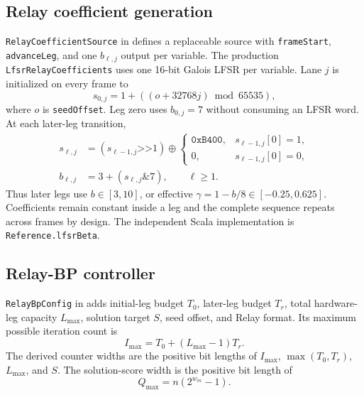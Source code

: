 \documentclass[10pt,conference]{IEEEtran}
\begin{document}
\subsection{Relay coefficient generation}
\texttt{RelayCoefficientSource} in  defines a
replaceable source with \texttt{frameStart}, \texttt{advanceLeg}, and one
$b_{\ell,j}$ output per variable.  The production
\texttt{LfsrRelayCoefficients} uses one 16-bit Galois LFSR per variable.  Lane
$j$ is initialized on every frame to
\begin{equation}
 s_{0,j}=1+\left((o+32768j)\bmod 65535\right),
 \label{eq:lfsr-seed}
\end{equation}
where $o$ is \texttt{seedOffset}.  Leg zero uses $b_{0,j}=7$ without consuming
an LFSR word.  At each later-leg transition,
\begin{align}
 s_{\ell,j}&=(s_{\ell-1,j}\mathbin{\texttt{>>}}1)
 \oplus\begin{cases}
 \mathtt{0xB400},&s_{\ell-1,j}[0]=1,\\
 0,&s_{\ell-1,j}[0]=0,
 \end{cases}\label{eq:lfsr-step}\\
 b_{\ell,j}&=3+(s_{\ell,j}\mathbin{\&}7),
 \qquad \ell\geq1.\label{eq:lfsr-beta}
\end{align}
Thus later legs use $b\in[3,10]$, or effective
$\gamma=1-b/8\in[-0.25,0.625]$.  Coefficients remain constant inside a leg and
the complete sequence repeats across frames by design.  The independent Scala
implementation is \texttt{Reference.lfsrBeta}.

\subsection{Relay-BP controller}
\texttt{RelayBpConfig} in  adds initial-leg budget
$T_0$, later-leg budget $T_r$, total hardware-leg capacity $L_{\max}$,
solution target $S$, seed offset, and Relay format.  Its maximum possible
iteration count is
\begin{equation}
 I_{\max}=T_0+(L_{\max}-1)T_r.
 \label{eq:relay-maximum-iterations}
\end{equation}
The derived counter widths are the positive bit lengths of $I_{\max}$,
$\max(T_0,T_r)$, $L_{\max}$, and $S$.  The solution-score width is the positive
bit length of
\begin{equation}
 Q_{\max}=n(2^{w_m}-1).
 \label{eq:score-width}
\end{equation}
\end{document}

